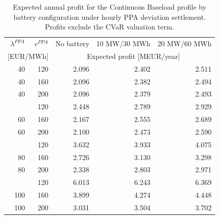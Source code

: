 \begin{table}[htbp]
\centering
\small
\caption{Expected annual profit for the Continuous Baseload profile by battery configuration under hourly PPA deviation settlement. Profits exclude the CVaR valuation term.}
\label{tab:battery_expected_profit_continuous_baseload}
\begin{tabular*}{\textwidth}{@{\extracolsep{\fill}}rrrrr@{}}
\toprule
$\lambda^{PPA}$ & $c^{PPA}$ & No battery & 10 MW/30 MWh & 20 MW/60 MWh \\
\multicolumn{2}{c}{[EUR/MWh]} & \multicolumn{3}{c}{Expected profit [MEUR/year]} \\
\midrule
40 & 120 & 2.096 & 2.402 & 2.511 \\
40 & 160 & 2.096 & 2.382 & 2.494 \\
40 & 200 & 2.096 & 2.379 & 2.493 \\
\addlinespace
60 & 120 & 2.448 & 2.789 & 2.929 \\
60 & 160 & 2.167 & 2.555 & 2.689 \\
60 & 200 & 2.100 & 2.473 & 2.590 \\
\addlinespace
80 & 120 & 3.632 & 3.933 & 4.075 \\
80 & 160 & 2.726 & 3.130 & 3.298 \\
80 & 200 & 2.338 & 2.803 & 2.971 \\
\addlinespace
100 & 120 & 6.013 & 6.243 & 6.369 \\
100 & 160 & 3.899 & 4.274 & 4.448 \\
100 & 200 & 3.031 & 3.504 & 3.702 \\
\bottomrule
\end{tabular*}
\end{table}

